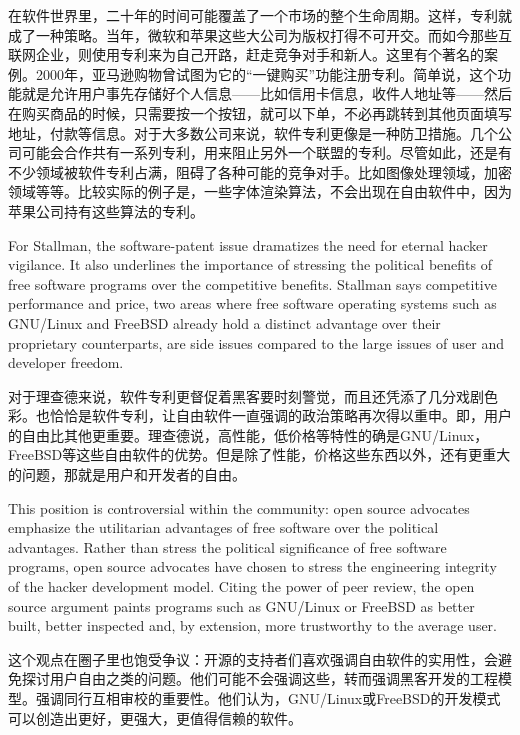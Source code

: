 \ifdefined\chs
在软件世界里，二十年的时间可能覆盖了一个市场的整个生命周期。这样，专利就成了一种策略。当年，微软和苹果这些大公司为版权打得不可开交。而如今那些互联网企业，则使用专利来为自己开路，赶走竞争对手和新人。这里有个著名的案例。2000年，亚马逊购物曾试图为它的``一键购买''功能注册专利。简单说，这个功能就是允许用户事先存储好个人信息——比如信用卡信息，收件人地址等——然后在购买商品的时候，只需要按一个按钮，就可以下单，不必再跳转到其他页面填写地址，付款等信息。对于大多数公司来说，软件专利更像是一种防卫措施。几个公司可能会合作共有一系列专利，用来阻止另外一个联盟的专利。尽管如此，还是有不少领域被软件专利占满，阻碍了各种可能的竞争对手。比如图像处理领域，加密领域等等。比较实际的例子是，一些字体渲染算法，不会出现在自由软件中，因为苹果公司持有这些算法的专利。
\fi

\ifdefined\eng
For Stallman, the software-patent issue dramatizes the need for eternal hacker vigilance. It also underlines the importance of stressing the political benefits of free software programs over the competitive benefits. Stallman says competitive performance and price, two areas where free software operating systems such as GNU/Linux and FreeBSD already hold a distinct advantage over their proprietary counterparts, are side issues compared to the large issues of user and developer freedom.
\fi

\ifdefined\chs
对于理查德来说，软件专利更督促着黑客要时刻警觉，而且还凭添了几分戏剧色彩。也恰恰是软件专利，让自由软件一直强调的政治策略再次得以重申。即，用户的自由比其他更重要。理查德说，高性能，低价格等特性的确是GNU/Linux，FreeBSD等这些自由软件的优势。但是除了性能，价格这些东西以外，还有更重大的问题，那就是用户和开发者的自由。
\fi

\ifdefined\eng
This position is controversial within the community: open source advocates emphasize the utilitarian advantages of free software over the political advantages. Rather than stress the political significance of free software programs, open source advocates have chosen to stress the engineering integrity of the hacker development model. Citing the power of peer review, the open source argument paints programs such as GNU/Linux or FreeBSD as better built, better inspected and, by extension, more trustworthy to the average user.
\fi

\ifdefined\chs
这个观点在圈子里也饱受争议：开源的支持者们喜欢强调自由软件的实用性，会避免探讨用户自由之类的问题。他们可能不会强调这些，转而强调黑客开发的工程模型。强调同行互相审校的重要性。他们认为，GNU/Linux或FreeBSD的开发模式可以创造出更好，更强大，更值得信赖的软件。
\fi

